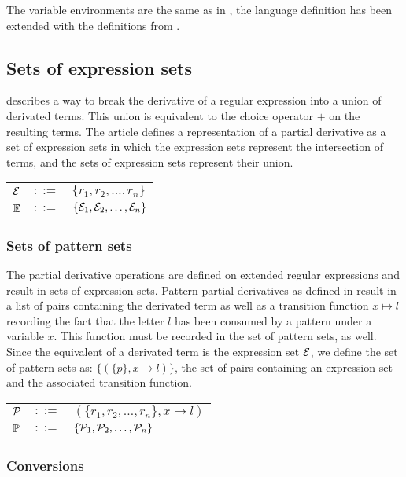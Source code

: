 The variable environments are the same as in \cite{pd-pat}, the language
definition has been extended with the definitions from \cite{pd-ere}.


\subsection{Sets of expression sets}

\cite{pd-ere} describes a way to break the derivative of a regular expression
into a union of derivated terms. This union is equivalent to the choice
operator $+$ on the resulting terms. The article defines a representation of a
partial derivative as a set of expression sets in which the expression sets
represent the intersection of terms, and the sets of expression sets represent
their union.

\begin{tabular}{lll}
   $\mathcal{E}$	& $::=$ & $\{r_1, r_2, \dots, r_n\}$ \\
   $\mathbb{E}$	& $::=$ & $\{\mathcal{E}_1, \mathcal{E}_2, \dots, \mathcal{E}_n\}$ \\
\end{tabular}

\subsubsection{Sets of pattern sets}

The partial derivative operations are defined on extended regular expressions
and result in sets of expression sets. Pattern partial derivatives as defined
in \cite{pd-pat} result in a list of pairs containing the derivated term as
well as a transition function $x \mapsto l$ recording the fact that the letter
$l$ has been consumed by a pattern under a variable $x$. This function must be
recorded in the set of pattern sets, as well. Since the equivalent of a
derivated term is the expression set $\mathcal{E}$, we define the set of
pattern sets as: $\{ (\{ p \}, x \to l) \}$, the set of pairs containing
an expression set and the associated transition function.

\begin{tabular}{lll}
   $\mathcal{P}$	& $::=$ & $(\{r_1, r_2, \dots, r_n\}, x \to l)$ \\
   $\mathbb{P}$	& $::=$ & $\{\mathcal{P}_1, \mathcal{P}_2, \dots, \mathcal{P}_n\}$ \\
\end{tabular}


\subsubsection{Conversions}

